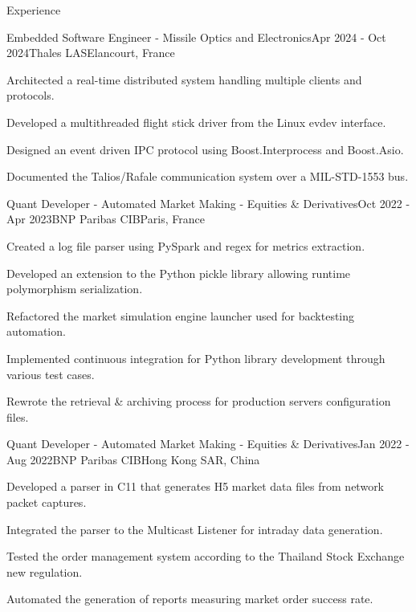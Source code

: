 \documentclass[
	a4paper, %
	10pt, %
]{resume} %
\def\CC{{C\nolinebreak[4]\hspace{-.05em}\raisebox{.4ex}{\tiny\bf ++}}}
\begin{document}
\begin{rSection}{Experience}
	\begin{rSubsection}{Embedded Software Engineer - Missile Optics and Electronics}{Apr 2024 - Oct 2024}{Thales LAS}{Elancourt, France}
    \item Architected a real-time distributed system handling multiple clients and protocols.
    \item Developed a multithreaded flight stick driver from the Linux evdev interface.
    \item Designed an event driven IPC protocol using Boost.Interprocess and Boost.Asio.
    \item Documented the Talios/Rafale communication system over a MIL-STD-1553 bus.
	\end{rSubsection}

	\begin{rSubsection}{Quant Developer - Automated Market Making - Equities \& Derivatives}{Oct 2022 - Apr 2023}{BNP Paribas CIB}{Paris, France}
		\item Created a log file parser using PySpark and regex for metrics extraction.
		\item Developed an extension to the Python pickle library allowing runtime polymorphism serialization.
		\item Refactored the market simulation engine launcher used for backtesting automation.
		\item Implemented continuous integration for Python library development through various test cases.
		\item Rewrote the retrieval \& archiving process for production servers configuration files.
	\end{rSubsection}

	\begin{rSubsection}{Quant Developer - Automated Market Making - Equities \& Derivatives}{Jan 2022 - Aug 2022}{BNP Paribas CIB}{Hong Kong SAR, China}
    \item Developed a parser in \CC11 that generates H5 market data files from network packet captures.
		\item Integrated the parser to the Multicast Listener for intraday data generation.
		\item Tested the order management system according to the Thailand Stock Exchange new regulation.
		\item Automated the generation of reports measuring market order success rate.
	\end{rSubsection}
\end{rSection}
\end{document}
